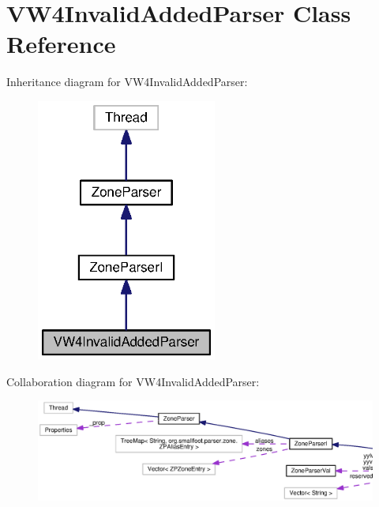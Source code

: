 \section{V\+W4\+Invalid\+Added\+Parser Class Reference}
\label{classorg_1_1smallfoot_1_1parser_1_1zone_1_1VW4InvalidAddedParser}


Inheritance diagram for V\+W4\+Invalid\+Added\+Parser\+:\nopagebreak
\begin{figure}[H]
\begin{center}
\leavevmode
\includegraphics[width=168pt]{classorg_1_1smallfoot_1_1parser_1_1zone_1_1VW4InvalidAddedParser__inherit__graph}
\end{center}
\end{figure}


Collaboration diagram for V\+W4\+Invalid\+Added\+Parser\+:
\nopagebreak
\begin{figure}[H]
\begin{center}
\leavevmode
\includegraphics[width=350pt]{classorg_1_1smallfoot_1_1parser_1_1zone_1_1VW4InvalidAddedParser__coll__graph}
\end{center}
\end{figure}

